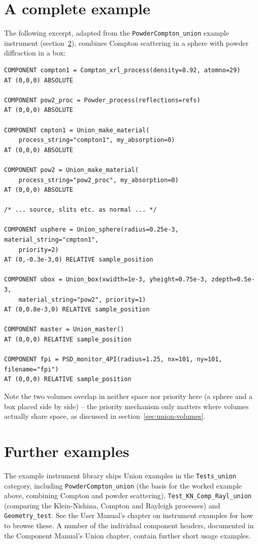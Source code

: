 \section{A complete example}
\label{sec:union-example}

The following excerpt, adapted from the \texttt{PowderCompton\_union}
example instrument (section~\ref{sec:union-further}), combines Compton
scattering in a sphere with powder diffraction in a box:
\begin{lstlisting}
COMPONENT compton1 = Compton_xrl_process(density=8.92, atomno=29)
AT (0,0,0) ABSOLUTE

COMPONENT pow2_proc = Powder_process(reflections=refs)
AT (0,0,0) ABSOLUTE

COMPONENT cmpton1 = Union_make_material(
    process_string="compton1", my_absorption=0)
AT (0,0,0) ABSOLUTE

COMPONENT pow2 = Union_make_material(
    process_string="pow2_proc", my_absorption=0)
AT (0,0,0) ABSOLUTE

/* ... source, slits etc. as normal ... */

COMPONENT usphere = Union_sphere(radius=0.25e-3, material_string="cmpton1",
    priority=2)
AT (0,-0.3e-3,0) RELATIVE sample_position

COMPONENT ubox = Union_box(xwidth=1e-3, yheight=0.75e-3, zdepth=0.5e-3,
    material_string="pow2", priority=1)
AT (0,0.8e-3,0) RELATIVE sample_position

COMPONENT master = Union_master()
AT (0,0,0) RELATIVE sample_position

COMPONENT fpi = PSD_monitor_4PI(radius=1.25, nx=101, ny=101, filename="fpi")
AT (0,0,0) RELATIVE sample_position
\end{lstlisting}
Note the two volumes overlap in neither space nor priority here (a sphere
and a box placed side by side) -- the priority mechanism only matters
where volumes actually share space, as discussed in
section~\ref{sec:union-volumes}.

\section{Further examples}
\label{sec:union-further}

The example instrument library ships Union examples in the
\texttt{Tests\_union} category, including \texttt{PowderCompton\_union}
(the basis for the worked example above, combining Compton and powder
scattering), \texttt{Test\_KN\_Comp\_Rayl\_union} (comparing the
Klein-Nishina, Compton and Rayleigh processes) and \texttt{Geometry\_test}.
See the User Manual's chapter on instrument examples for how to browse
these. A number of the individual component headers, documented in the
Component Manual's Union chapter, contain further short usage examples.

